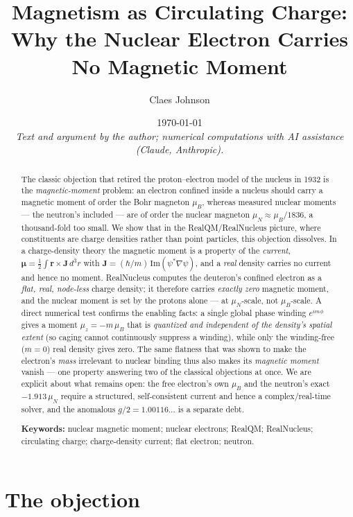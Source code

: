 \documentclass[11pt]{article}
\title{Magnetism as Circulating Charge:\\
Why the Nuclear Electron Carries No Magnetic Moment}
\author[1]{Claes Johnson}
\affil[1]{KTH Royal Institute of Technology, SE-100 44 Stockholm, Sweden \\
\texttt{claesjohnson@gmail.com}}
\date{\today \\[0.4em]
\small\textit{Text and argument by the author; numerical computations with AI assistance (Claude, Anthropic).}}
\begin{document}
\maketitle

\begin{abstract}
The classic objection that retired the proton--electron model of the nucleus in 1932 is the
\emph{magnetic-moment} problem: an electron confined inside a nucleus should carry a magnetic moment of
order the Bohr magneton $\mu_B$, whereas measured nuclear moments --- the neutron's included --- are of
order the nuclear magneton $\mu_N \approx \mu_B/1836$, a thousand-fold too small. We show that in the
RealQM/RealNucleus picture, where constituents are charge densities rather than point particles, this
objection dissolves. In a charge-density theory the magnetic moment is a property of the \emph{current},
$\boldsymbol\mu = \tfrac12\!\int \mathbf r\times\mathbf J\,d^3r$ with
$\mathbf J = (\hbar/m)\,\mathrm{Im}(\psi^*\nabla\psi)$, and a \emph{real} density carries no current and
hence no moment. RealNucleus computes the deuteron's confined electron as a \emph{flat, real,
node-less} charge density; it therefore carries \emph{exactly zero} magnetic moment, and the nuclear
moment is set by the protons alone --- at $\mu_N$-scale, not $\mu_B$-scale. A direct numerical test
confirms the enabling facts: a single global phase winding $e^{im\phi}$ gives a moment $\mu_z=-m\,\mu_B$
that is \emph{quantized and independent of the density's spatial extent} (so caging cannot continuously
suppress a winding), while only the winding-free ($m=0$) real density gives zero. The same flatness that
was shown to make the electron's \emph{mass} irrelevant to nuclear binding thus also makes its
\emph{magnetic moment} vanish --- one property answering two of the classical objections at once. We are
explicit about what remains open: the free electron's own $\mu_B$ and the neutron's exact
$-1.913\,\mu_N$ require a structured, self-consistent current and hence a complex/real-time solver, and
the anomalous $g/2 = 1.00116\ldots$ is a separate debt.

\medskip
\noindent\textbf{Keywords:} nuclear magnetic moment; nuclear electrons; RealQM; RealNucleus; circulating
charge; charge-density current; flat electron; neutron.
\end{abstract}


\section{The objection}
\label{sec:objection}
\end{document}
